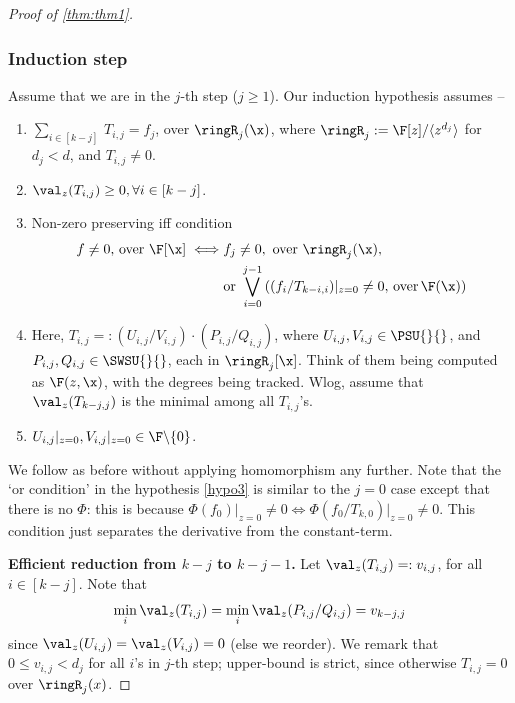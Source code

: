\begin{proof}[Proof of \autoref{thm:thm1}]
\vspace*{1em}
\subsubsection*{Induction step} 

Assume that we are in the $j$-th step ($j\ge1$). Our induction hypothesis assumes --

\begin{enumerate}
    \item $\sum_{i \in [k-j]}\, T_{i,j} = f_j$, over $\ringR_j(\x)$, where $\ringR_j:= \F[z]/\langle z^{d_j}\rangle$ for \(d_j < d\), and $T_{i,j} \ne 0$. \label{hypo1}
    \item $\val_{z}(T_{i,j}) \ge 0, \forall i \in [k-j]$. \label{hypo2}
    \item Non-zero preserving iff condition
    \begin{align*} 
        f \neq 0 \text{, over } \F[\x] \iff & f_j \ne 0, \text{ over } \ringR_j(\x), \\
        & \text{or }\bigvee_{i=0}^{j-1} \left((f_i/T_{k-i,i}) \rvert_{z=0}\ne 0,\, \text{over}\,\F(\x)\right)
    \end{align*} \label{hypo3}
    \item Here, $T_{i,j}=: \left( U_{i,j}/V_{i,j} \right) \cdot \left( P_{i,j}/Q_{i,j} \right)$, where $U_{i,j}, V_{i,j} \in \PSU{}{}$, and $P_{i,j}, Q_{i,j} \in \SWSU{}{}$, each in $\ringR_j[\x]$. Think of them being computed as $\F(z,\x)$, with the degrees being tracked. Wlog, assume that $\val_{z}(T_{k-j,j})$ is the minimal among all $T_{i,j}$'s. \label{hypo4}
    \item $U_{i,j}\rvert_{z=0}, V_{i,j}\rvert_{z=0}  \in \F\backslash \{0\}$. \label{hypo5}
\end{enumerate} 

We follow as before without applying homomorphism any further. Note that the `or condition' in the hypothesis \ref{hypo3} is similar to the $j=0$ case except that there is no $\Phi$: this is because $\Phi(f_0)\rvert_{z=0} \ne 0 \iff \Phi(f_0/T_{k,0})\rvert_{z=0} \ne 0$. This condition just separates the derivative from the constant-term.

\textbf{Efficient reduction from $k-j$ to $k-j-1$.} Let $\val_{z}(T_{i,j})=:v_{i,j}$, for all $i \in [k-j]$. Note that \[\min_{i} \val_{z}(T_{i,j})=\min_{i}\val_{z}(P_{i,j}/Q_{i,j})=v_{k-j,j}\] since $\val_{z}(U_{i,j}) =\val_{z}(V_{i,j}) =0$ (else we reorder). We remark that  $ 0 \le v_{i,j} < d_j$ for all $i$'s in $j$-th step; upper-bound is strict, since otherwise $T_{i,j}=0$ over $\ringR_j(x)$.


\end{proof}
